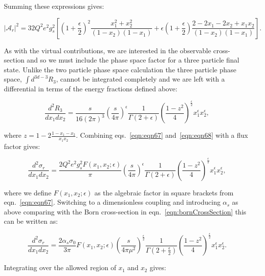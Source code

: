 		Summing these expressions gives:

		\begin{equation}
			|\mathcal{A}_r|^2 = 32Q^2e^2g_s^2\left[\left(1+\frac{\epsilon}{2}\right)^2\frac{x_1^2+x_2^2}{(1-x_2)(1-x_1)} +
			\epsilon\left(1+\frac{\epsilon}{2}\right)\frac{2-2x_1-2x_2+x_1x_2}{(1-x_2)(1-x_1)}\right].
			\label{eqn:eqn67}
		\end{equation}

		As with the virtual contributions, we are interested in the observable cross-section and so we must
		include the phase space factor for a three particle final state.  Unlike the two particle phase space
		calculation the three particle phase space, $\int d^{3d-3}R_3$, cannot be integrated completely and we are left with a
		differential in terms of the energy fractions defined above:

		\begin{equation}
			\frac{d^2R_3}{dx_1dx_2} = \frac{s}{16(2\pi)^3}\left(\frac{s}{4\pi}\right)^\epsilon\frac{1}{\Gamma(2+\epsilon)}
			\left(\frac{1-z^2}{4}\right)^{\frac{\epsilon}{2}}x_1^\epsilon x_2^\epsilon,
			\label{eqn:eqn68}
		\end{equation}

		where $z = 1 - 2\frac{1-x_1-x_2}{x_1x_2}$.  Combining eqs.~\eqref{eqn:eqn67} and~\eqref{eqn:eqn68} with a flux factor gives:

		\begin{equation}
			\frac{d^2\sigma_r}{dx_1dx_2} = \frac{2Q^2e^2g_s^2F(x_1, x_2; \epsilon)}{\pi}\left(\frac{s}{4\pi}\right)^\epsilon
			\frac{1}{\Gamma(2+\epsilon)}\left(\frac{1-z^2}{4}\right)^{\frac{\epsilon}{2}}x_1^\epsilon x_2^\epsilon,
		\end{equation}

		where we define $F(x_1, x_2; \epsilon)$ as the algebraic factor in square brackets from eqn.~\eqref{eqn:eqn67}.  Switching to
		a dimensionless coupling and introducing $\alpha_s$ as above comparing with the Born cross-section in
		eqn.~\eqref{eqn:bornCrossSection} this can be written as:

		\begin{equation}
			\frac{d^2\sigma_r}{dx_1dx_2} = \frac{2\alpha_s\sigma_0}{3\pi}F(x_1, x_2; \epsilon)\left(\frac{s}{4\pi\mu^2}\right)^
			{\frac{\epsilon}{2}}\frac{1}{\Gamma(2+\frac{\epsilon}{2})}\left(\frac{1-z^2}{4}\right)^{\frac{\epsilon}{2}}x_1^\epsilon x_2^\epsilon.
		\end{equation}

		Integrating over the allowed region of $x_1$ and $x_2$ gives:

